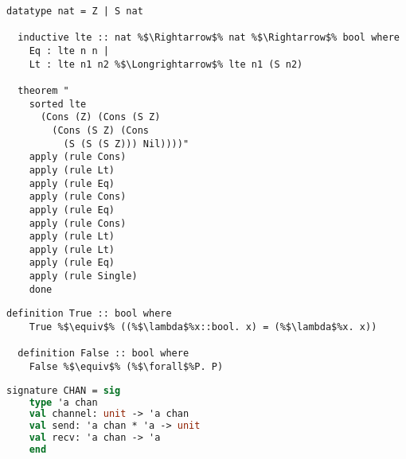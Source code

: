 \documentclass{article}
\begin{document}
\begin{lstlisting}[style=codestyle1, escapechar=\%]
  datatype nat = Z | S nat 

  inductive lte :: nat %$\Rightarrow$% nat %$\Rightarrow$% bool where
    Eq : lte n n |
    Lt : lte n1 n2 %$\Longrightarrow$% lte n1 (S n2)

  theorem "
    sorted lte
      (Cons (Z) (Cons (S Z)
        (Cons (S Z) (Cons
          (S (S (S Z))) Nil))))"
    apply (rule Cons)
    apply (rule Lt)
    apply (rule Eq)
    apply (rule Cons)
    apply (rule Eq)
    apply (rule Cons)
    apply (rule Lt)
    apply (rule Lt)
    apply (rule Eq)
    apply (rule Single)
    done
  \end{lstlisting}

\begin{lstlisting}[style=codestyle1, escapechar=\%]
  definition True :: bool where 
    True %$\equiv$% ((%$\lambda$%x::bool. x) = (%$\lambda$%x. x))

  definition False :: bool where 
    False %$\equiv$% (%$\forall$%P. P)

  \end{lstlisting}

\begin{lstlisting}[language=ML, style=codestyle1]
  signature CHAN = sig
    type 'a chan 
    val channel: unit -> 'a chan
    val send: 'a chan * 'a -> unit
    val recv: 'a chan -> 'a
    end     
\end{lstlisting}
\end{document}
